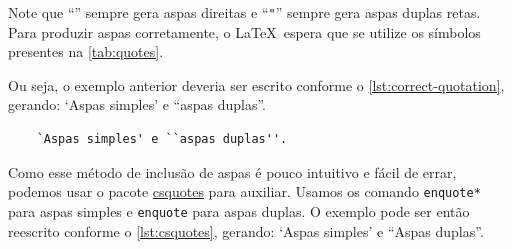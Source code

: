 Note que \enquote{\texttt{\textquotesingle}} sempre gera aspas direitas e \enquote{\texttt{"}} sempre gera aspas duplas retas. %
Para produzir aspas corretamente, o \LaTeX\ espera que se utilize os símbolos presentes na \autoref{tab:quotes}.

\begin{table}[htb]
  \begin{center}
  \end{center}
\end{table}

Ou seja, o exemplo anterior deveria ser escrito conforme o \autoref{lst:correct-quotation}, gerando:
`Aspas simples' e ``aspas duplas''.

\begin{listing}[htb]
  \begin{verbatim}
    `Aspas simples' e ``aspas duplas''.
  \end{verbatim}
  \caption{Uso correto de aspas}
  \label{lst:correct-quotation}
\end{listing}

Como esse método de inclusão de aspas é pouco intuitivo e fácil de errar, podemos usar o pacote \href{https://ctan.org/pkg/csquotes}{csquotes} para auxiliar. Usamos os comando \texttt{enquote*} para aspas simples e \texttt{enquote} para aspas duplas.
O exemplo pode ser então reescrito conforme o \autoref{lst:csquotes}, gerando:
\enquote*{Aspas simples} e \enquote{Aspas duplas}.

